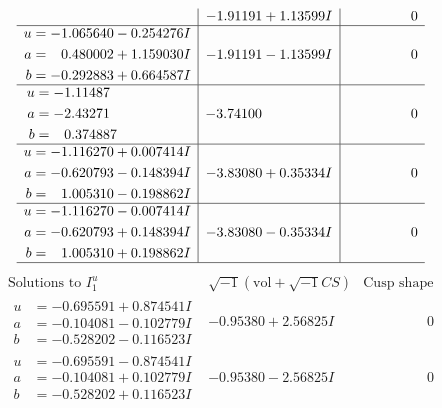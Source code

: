 \documentclass[1p]{elsarticle_modified}
\theoremstyle{definition}
\newcommand{\I}{\sqrt{-1}}
\begin{document}
$$\begin{array}{c|c|c}
 & -1.91191 + 1.13599 I & \phantom{-0.000000 } 0 \\ \hline\begin{aligned}
u &= -1.065640 - 0.254276 I \\
a &= \phantom{-}0.480002 + 1.159030 I \\
b &= -0.292883 + 0.664587 I\end{aligned}
 & -1.91191 - 1.13599 I & \phantom{-0.000000 } 0 \\ \hline\begin{aligned}
u &= -1.11487\phantom{ +0.000000I} \\
a &= -2.43271\phantom{ +0.000000I} \\
b &= \phantom{-}0.374887\phantom{ +0.000000I}\end{aligned}
 & -3.74100\phantom{ +0.000000I} & \phantom{-0.000000 } 0 \\ \hline\begin{aligned}
u &= -1.116270 + 0.007414 I \\
a &= -0.620793 - 0.148394 I \\
b &= \phantom{-}1.005310 - 0.198862 I\end{aligned}
 & -3.83080 + 0.35334 I & \phantom{-0.000000 } 0 \\ \hline\begin{aligned}
u &= -1.116270 - 0.007414 I \\
a &= -0.620793 + 0.148394 I \\
b &= \phantom{-}1.005310 + 0.198862 I\end{aligned}
 & -3.83080 - 0.35334 I & \phantom{-0.000000 } 0\\
 \hline 
 \end{array}$$\newpage$$\begin{array}{c|c|c}  
\text{Solutions to }I^u_{1}& \I (\text{vol} + \sqrt{-1}CS) & \text{Cusp shape}\\
 \hline 
\begin{aligned}
u &= -0.695591 + 0.874541 I \\
a &= -0.104081 - 0.102779 I \\
b &= -0.528202 - 0.116523 I\end{aligned}
 & -0.95380 + 2.56825 I & \phantom{-0.000000 } 0 \\ \hline\begin{aligned}
u &= -0.695591 - 0.874541 I \\
a &= -0.104081 + 0.102779 I \\
b &= -0.528202 + 0.116523 I\end{aligned}
 & -0.95380 - 2.56825 I & \phantom{-0.000000 } 0 \\ \hline\begin{aligned}

\end{aligned}
\end{array}$$
\end{document}
